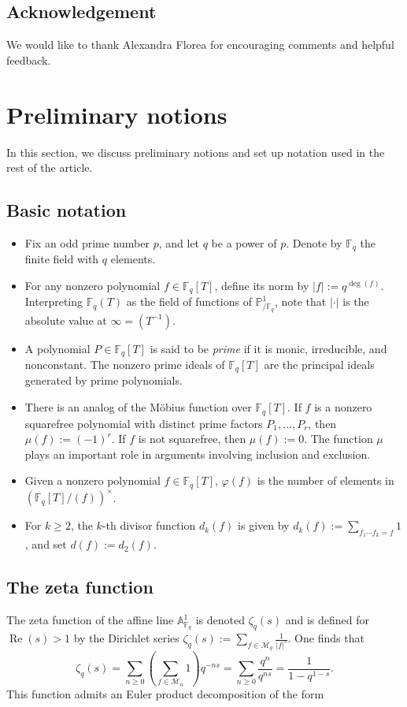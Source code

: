 \documentclass[table]{amsart}
\newcommand{\F}{\mathbb{F}}
\newcommand{\op}[1]{\operatorname{#1}}
\numberwithin{equation}{section}
\begin{document}
\subsection{Acknowledgement} We would like to thank Alexandra Florea for encouraging comments and helpful feedback. 

\section{Preliminary notions}\label{s 2}
\par In this section, we discuss preliminary notions and set up notation used in the rest of the article.
\subsection{Basic notation}
\begin{itemize}
    \item Fix an odd prime number \( p \), and let \( q \) be a power of \( p \). Denote by \( \mathbb{F}_q \) the finite field with \( q \) elements.
    \item For any nonzero polynomial \( f \in \mathbb{F}_q[T] \), define its norm by \( |f| := q^{\deg(f)} \). Interpreting \( \F_q(T) \) as the field of functions of \( \mathbb{P}^1_{/\F_q} \), note that \( |\cdot| \) is the absolute value at \( \infty = (T^{-1}) \).
    \item A polynomial \( P \in \mathbb{F}_q[T] \) is said to be \emph{prime} if it is monic, irreducible, and nonconstant. The nonzero prime ideals of \( \mathbb{F}_q[T] \) are the principal ideals generated by prime polynomials. 
    \item There is an analog of the Möbius function over \( \mathbb{F}_q[T] \). If \( f \) is a nonzero squarefree polynomial with distinct prime factors \( P_1, \dots, P_r \), then \( \mu(f) := (-1)^r \). If \( f \) is not squarefree, then \( \mu(f) := 0 \). The function \( \mu \) plays an important role in arguments involving inclusion and exclusion.
    \item Given a nonzero polynomial \( f \in \F_q[T] \), $ \varphi(f)$ is the number of elements in $\left( \F_q[T]/(f) \right)^\times$.
    \item For \( k \geq 2 \), the \( k \)-th divisor function \( d_k(f) \) is given by $
    d_k(f) := \sum_{f_1 \cdots f_k = f} 1$,
    and set \( d(f) := d_2(f) \).
\end{itemize}



\subsection{The zeta function}
The zeta function of the affine line \( \mathbb{A}^1_{\mathbb{F}_q} \) is denoted $\zeta_q(s)$ and is defined for $\op{Re}(s)>1$ by the Dirichlet series $\zeta_q(s) := \sum_{f \in \mathcal{M}_q} \frac{1}{|f|^s}$. One finds that
\[
\zeta_q(s) = \sum_{n \geq 0} \left( \sum_{f \in \mathcal{M}_n} 1 \right) q^{-ns} = \sum_{n \geq 0} \frac{q^n}{q^{ns}} = \frac{1}{1 - q^{1-s}}.
\]
\noindent This function admits an Euler product decomposition of the form
\end{document}
